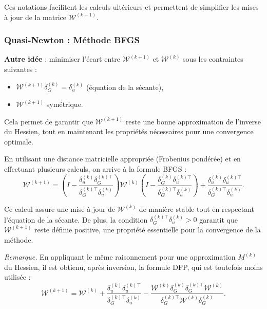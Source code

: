 \begin{sloppypar}
Ces notations facilitent les calculs ultérieurs et permettent de simplifier les mises à jour de la matrice $\mathcal{W}^{(k+1)}$.

\subsubsection{Quasi-Newton : Méthode BFGS}

\textbf{Autre idée} : minimiser l’écart entre $\mathcal{W}^{(k+1)}$ et $\mathcal{W}^{(k)}$ sous les contraintes suivantes :
   \begin{itemize}
       \item $\mathcal{W}^{(k+1)} \delta_G^{(k)} = \delta_u^{(k)}$ \quad (équation de la sécante),
       \item $\mathcal{W}^{(k+1)}$ symétrique.
   \end{itemize}

Cela permet de garantir que $\mathcal{W}^{(k+1)}$ reste une bonne approximation de l'inverse du Hessien, tout en maintenant les propriétés nécessaires pour une convergence optimale.

En utilisant une distance matricielle appropriée (Frobenius pondérée) et en effectuant plusieurs calculs, on arrive à la formule BFGS :
\begin{equation}
    \mathcal{W}^{(k+1)} = \left( I - \frac{\delta_u^{(k)} \delta_G^{(k) \top}}{\delta_G^{(k) \top} \delta_u^{(k)}} \right) \mathcal{W}^{(k)} \left( I - \frac{\delta_G^{(k)} \delta_u^{(k) \top}}{\delta_G^{(k) \top} \delta_u^{(k)}} \right) + \frac{\delta_u^{(k)} \delta_u^{(k) \top}}{\delta_G^{(k) \top} \delta_u^{(k)}}.
\end{equation}

Ce calcul assure une mise à jour de $\mathcal{W}^{(k)}$ de manière stable tout en respectant l'équation de la sécante. De plus, la condition $\delta_G^{(k) \top} \delta_u^{(k)} > 0$ garantit que $\mathcal{W}^{(k+1)}$ reste définie positive, une propriété essentielle pour la convergence de la méthode.

\textit{Remarque.} En appliquant le même raisonnement pour une approximation $M^{(k)}$ du Hessien, il est obtienu, après inversion, la formule DFP, qui est toutefois moins utilisée :
\begin{equation*}
    \mathcal{W}^{(k+1)} = \mathcal{W}^{(k)} + \frac{\delta_u^{(k)} \delta_u^{(k) \top}}{\delta_G^{(k) \top} \delta_u^{(k)}} - \frac{\mathcal{W}^{(k)} \delta_G^{(k)} \delta_G^{(k) \top} \mathcal{W}^{(k)}}{\delta_G^{(k) \top} \mathcal{W}^{(k)} \delta_G^{(k)}}.
\end{equation*}


\end{sloppypar}
